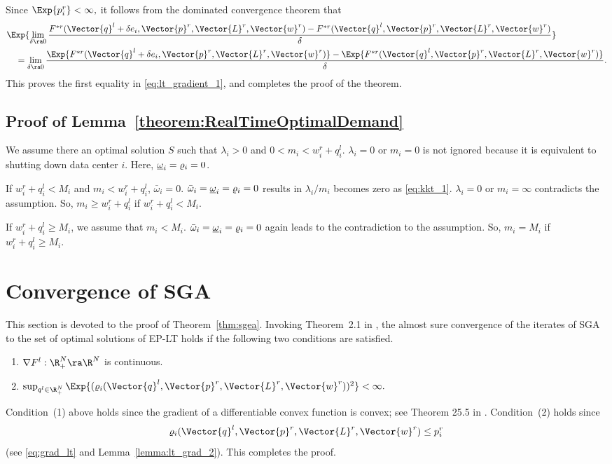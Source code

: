 Since $\Exp{p^r_i} < \infty,$ it follows from the dominated
convergence theorem that 
\begin{align*}
  &\Exp{\lim_{\delta \ra 0} \frac{F^{*r}(\Vector{q}^l + \delta
      e_i,\Vector{p}^r,\Vector{L}^r,\Vector{w}^r) -
      F^{*r}(\Vector{q}^l,\Vector{p}^r,\Vector{L}^r,\Vector{w}^r)}{\delta}} \\
  &\quad =\lim_{\delta \ra 0} \frac{\Exp{F^{*r}(\Vector{q}^l + \delta
      e_i,\Vector{p}^r,\Vector{L}^r,\Vector{w}^r)} -
    \Exp{F^{*r}(\Vector{q}^l,\Vector{p}^r,\Vector{L}^r,\Vector{w}^r)}}{\delta}.
\end{align*}
This proves the first equality in \eqref{eq:lt_gradient_1}, and
completes the proof of the theorem.


\subsection{Proof of Lemma~\ref{theorem:RealTimeOptimalDemand}}
\label{proof:RealTimeOptimalDemand}

 We assume there an optimal solution $S$ such that $\lambda_i>0$ and $0 < m_i < w^r_i + q^l_i$. $\lambda_i=0$ or $m_i = 0$ is not ignored because it is equivalent to shutting down data center $i$. Here, $\underbar{$\omega$}_i=\varrho_i = 0$.
 
 If $w^r_i + q^l_i < M_i$ and $m_i < w^r_i + q^l_i$, $\bar{\omega}_i = 0$. $\bar{\omega}_i = \underbar{$\omega$}_i=\varrho_i = 0$ results in $\lambda_i/m_i$ becomes zero as \eqref{eq:kkt_1}. $\lambda_i=0$ or $m_i = \infty$ contradicts the assumption. So, $m_i \geq w^r_i+q^l_i$ if $w^r_i + q^l_i < M_i$. 
 
 If $w^r_i + q^l_i \geq M_i$, we assume that $m_i < M_i$. $\bar{\omega}_i = \underbar{$\omega$}_i=\varrho_i = 0$ again leads to the contradiction to the assumption. So, $m_i=M_i$ if $w^r_i + q^l_i \geq M_i$.

\section{Convergence of SGA}
\label{sec:conv-proof}

This section is devoted to the proof of Theorem~\ref{thm:sgea}.
Invoking Theorem~2.1 in \cite{Kushner03}, the almost sure convergence
of the iterates of SGA to the set of optimal solutions of EP-LT holds
if the following two conditions are satisfied.
  \begin{enumerate}
  \item $\nabla F^l:\R^N_+ \ra \R^N$ is continuous.
  \item $ \sup_{q^l \in \R^N_+}
    \Exp{(\varrho_i(\Vector{q}^l,\Vector{p}^r,\Vector{L}^r,\Vector{w}^r))^2}
    < \infty.$
  \end{enumerate}
  Condition~(1) above holds since the gradient of a differentiable
  convex function is convex; see Theorem 25.5 in
  \cite{Rockafellar70}. Condition~(2) holds since $$
  \varrho_i(\Vector{q}^l,\Vector{p}^r,\Vector{L}^r,\Vector{w}^r) \leq
  p^r_i$$ (see \eqref{eq:grad_lt} and
  Lemma~\ref{lemma:lt_grad_2}). This completes the proof.



